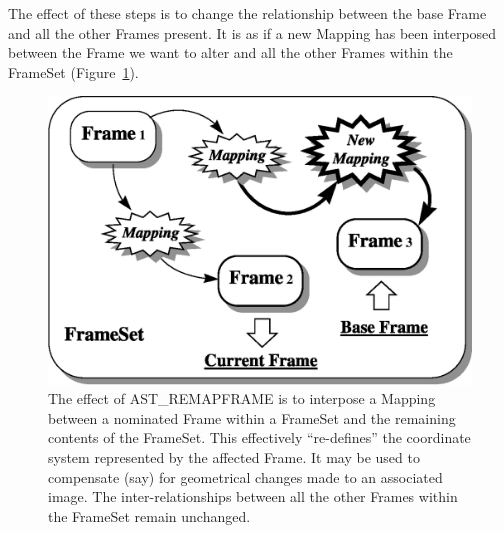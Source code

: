 \documentclass[twoside,11pt]{article}
\newenvironment{latexonly}{}{}
\newcommand{\htmlref}[2]{#1}
\begin{document}
\begin{latexonly}
   The effect of these steps is to change the relationship between the
   base Frame and all the other Frames present. It is as if a new Mapping
   has been interposed between the Frame we want to alter and all the
   other Frames within the FrameSet (Figure~\ref{fig:fsremap}).
   \begin{figure}[hbtp]
   \begin{center}
   \includegraphics[scale=0.6]{sun210_figures/fsremap.eps}
   \caption{The effect of \htmlref{AST\_REMAPFRAME}{AST_REMAPFRAME} is to interpose a Mapping between
   a nominated Frame within a FrameSet and the remaining contents of the
   FrameSet. This effectively ``re-defines'' the coordinate system
   represented by the affected Frame. It may be used to compensate (say)
   for geometrical changes made to an associated image. The
   inter-relationships between all the other Frames within the FrameSet
   remain unchanged.}
   \label{fig:fsremap}
   \end{center}
   \end{figure}
\end{latexonly}
\end{document}
